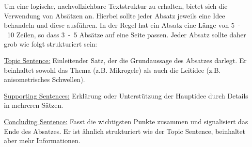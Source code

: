     Um eine logische, nachvollziehbare Textstruktur zu erhalten, bietet sich die Verwendung von Absätzen an. Hierbei sollte jeder Absatz jeweils eine Idee behandeln und diese ausführen. In der Regel hat ein Absatz eine Länge von 5~-~10 Zeilen, so dass 3~-~5 Absätze auf eine Seite passen. Jeder Absatz sollte daher grob wie folgt strukturiert sein:
    \begin{compactitem}
        \item \underline{Topic Sentence:} Einleitender Satz, der die Grundaussage des Absatzes darlegt. Er beinhaltet sowohl das Thema (z.B. Mikrogele) als auch die Leitidee (z.B. anisometrisches Schwellen).
        \item \underline{Supporting Sentences:} Erklärung oder Unterstützung der Hauptidee durch Details in mehreren Sätzen.
        \item \underline{Concluding Sentence:} Fasst die wichtigsten Punkte zusammen und signalisiert das Ende des Absatzes. Er ist ähnlich strukturiert wie der Topic Sentence, beinhaltet aber mehr Informationen.
    \end{compactitem}
    
    
\FloatBarrier
